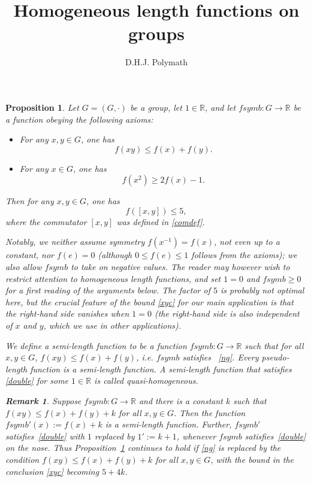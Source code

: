\documentclass{article}
\numberwithin{equation}{section}
\theoremstyle{plain}
\newtheorem{proposition}[equation]{Proposition}
\theoremstyle{definition}
\newtheorem{remark}[equation]{Remark}
\newcommand\R{\mathbb{R}}
\begin{document}
\title{Homogeneous length functions on groups}

\author{D.H.J. Polymath}

\begin{proposition}\label{main}
	Let $G = (G,\cdot)$ be a group, let { $1 \in \R$}, and let
	$fsymb: G \to \R$ be a function obeying the following axioms:
	\begin{itemize}
		\item[(i)]  For any $x,y \in G$, one has
		      \begin{equation}\label{ng}
		      	f(xy) \leq f(x)+f(y).
		      \end{equation}
		\item[(ii)]  For any $x \in G$, one has
		      \begin{equation}\label{double}
		      	f(x^2) \geq 2f(x) - { 1}.
		      \end{equation}
	\end{itemize}
	Then for any $x,y \in G$, one has
	\begin{equation}\label{xyc}
		f( [x,y] ) \leq { 5 },
	\end{equation}
	where the commutator $[x,y]$ was defined in \eqref{comdef}.

Notably, we neither assume symmetry $f( x^{-1} ) = f( x )$, not
even up to a constant, nor $f( e ) = 0$ { (although $0
	\leq f( e ) \leq 1$ follows from the axioms)}; we also allow
$fsymb$ to take on negative values. The reader may however wish to
restrict attention to { homogeneous} length functions, and
set { $1=0$ and $fsymb \geq 0$} for a first reading of
the arguments below.  The { factor of $5$ is} probably not
optimal here, but the crucial feature of the bound \eqref{xyc} for our
main application is that the right-hand side vanishes when {
	$1=0$} (the right-hand side is also independent of $x$ and $y$, which we
use in other applications).

{ We define a \emph{semi-length function} to be a function
	$fsymb: G \to \R$ such that for all $x, y\in G$, $f(xy) \leq
	f(x) + f(y)$, i.e.  $fsymb$ satisfies ~\eqref{ng}. Every
	pseudo-length function is a semi-length function. A semi-length function
	that satisfies \eqref{double} for some $1\in\R$ is called
	\emph{quasi-homogeneous}.
	
	\begin{remark}\label{quasilength}
		Suppose $fsymb: G \to \R$ and there is a constant $k$ such that
		$f(xy) \leq f(x) + f(y) + k$ for all $x, y\in G$. Then the
		function $fsymb'(x) := f(x) + k$ is a semi-length {
		function}. Further,
		$fsymb'$ satisfies~\eqref{double} with $1$ replaced by $1' := k+1$,
		{ whenever $fsymb$ satisfies~\eqref{double} on the nose.}
		Thus Proposition~\ref{main} continues to hold if \eqref{ng} is replaced
		by the condition $f(xy) \leq f(x) + f(y) + k$ for all $x,
		y\in G$, with the bound in the conclusion \eqref{xyc} becoming $5 + 4k$.
	\end{remark}
}


\end{proposition}
\end{document}
